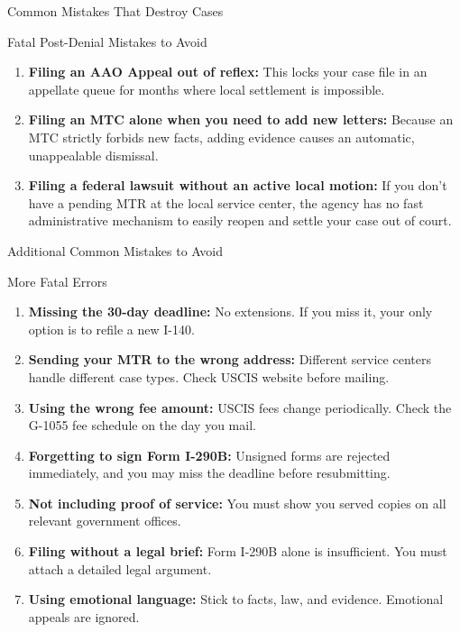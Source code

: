 \documentclass[11pt]{beamer}
\begin{document}
	\begin{frame}{Common Mistakes That Destroy Cases}
		\scriptsize
		\begin{block}{Fatal Post-Denial Mistakes to Avoid}
			\begin{enumerate}
				\item \textbf{Filing an AAO Appeal out of reflex:} This locks your case file in an appellate queue for months where local settlement is impossible.
				\item \textbf{Filing an MTC alone when you need to add new letters:} Because an MTC strictly forbids new facts, adding evidence causes an automatic, unappealable dismissal.
				\item \textbf{Filing a federal lawsuit without an active local motion:} If you don't have a pending MTR at the local service center, the agency has no fast administrative mechanism to easily reopen and settle your case out of court.
			\end{enumerate}
		\end{block}
	\end{frame}
	
	\begin{frame}{Additional Common Mistakes to Avoid}
		\scriptsize
		\begin{block}{More Fatal Errors}
			\begin{enumerate}
				\item \textbf{Missing the 30-day deadline:} No extensions. If you miss it, your only option is to refile a new I-140.
				\item \textbf{Sending your MTR to the wrong address:} Different service centers handle different case types. Check USCIS website before mailing.
				\item \textbf{Using the wrong fee amount:} USCIS fees change periodically. Check the G-1055 fee schedule on the day you mail.
				\item \textbf{Forgetting to sign Form I-290B:} Unsigned forms are rejected immediately, and you may miss the deadline before resubmitting.
				\item \textbf{Not including proof of service:} You must show you served copies on all relevant government offices.
				\item \textbf{Filing without a legal brief:} Form I-290B alone is insufficient. You must attach a detailed legal argument.
				\item \textbf{Using emotional language:} Stick to facts, law, and evidence. Emotional appeals are ignored.
			\end{enumerate}
		\end{block}
	\end{frame}
	
\end{document}
